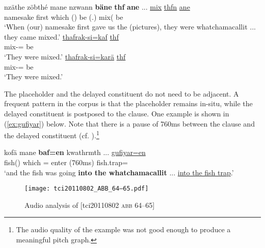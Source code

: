 \documentclass[output=paper,colorlinks,citecolor=brown]{langscibook}
\begin{document}
\ea \label{ex:pictask-1}
     \label{ex:pictask-1a}
        \hspace*{-.5em}\gll nzäthe zöbthé mane nzwann \textbf{bäne} \textbf{thf} \textbf{ane} ... \uline{mix} \uline{thfn} \uline{ane}\\
        namesake first which  () be  (.) mix( be \\
        \glt `When (our) namesake first gave us the (pictures), they were whatchamacallit ... they came mixed.' 
     \label{ex:pictask-1b}
        \hspace*{-.25em}\gll \uline{thafrak-si=kaf} \uline{thf}\\
        mix-= be\\
        \glt `They were mixed.' 
     \label{ex:pictask-1c}
        \hspace*{-.5em}\gll \uline{thafrak-si=karä} \uline{thf}\\
        mix-= be\\
        \glt `They were mixed.' 
\z

The placeholder and the delayed constituent do not need to be adjacent. A frequent pattern in the corpus is that the placeholder remains in-situ, while the delayed constituent is postposed to the clause. One example is shown in (\ref{ex:gufiyar}) below. Note that there is a pause of 760ms between the clause and the delayed constituent (cf. ).\footnote{The audio quality of the example was not good enough to produce a meaningful pitch graph.}

\ea \label{ex:gufiyar}
    \gll kofä mane \textbf{baf=en} kwathrmth ... \uline{gufiyar=en}\\
    fish() which = enter (760ms) fish.trap=\\
    \glt `and the fish was going \textbf{into the whatchamacallit} ... \uline{into the fish trap}.' 
\z

\begin{figure}[H]
    \texttt{[image: tci20110802\_ABB\_64–65.pdf]}
    \caption{Audio analysis of [tci20110802 \textsc{abb} 64--65]}
    \label{fig:doehler:gufiyar}
\end{figure}
\end{document}
